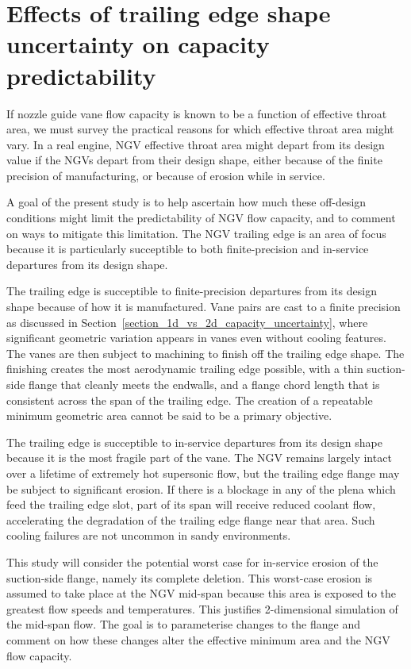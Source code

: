 \documentclass[a4paper, 11pt, twoside]{report}
\begin{document}
\section{Effects of trailing edge shape uncertainty on capacity predictability}

If nozzle guide vane flow capacity is known to be a function of effective throat area, we must survey the practical reasons for which effective throat area might vary. In a real engine, NGV effective throat area might depart from its design value if the NGVs depart from their design shape, either because of the finite precision of manufacturing, or because of erosion while in service. 

A goal of the present study is to help ascertain how much these off-design conditions might limit the predictability of NGV flow capacity, and to comment on ways to mitigate this limitation. The NGV trailing edge is an area of focus because it is particularly succeptible to both finite-precision and in-service departures from its design shape. 

The trailing edge is succeptible to finite-precision departures from its design shape because of how it is manufactured. Vane pairs are cast to a finite precision as discussed in Section~\ref{section_1d_vs_2d_capacity_uncertainty}, where significant geometric variation appears in vanes even without cooling features. The vanes are then subject to machining to finish off the trailing edge shape. The finishing creates the most aerodynamic trailing edge possible, with a thin suction-side flange that cleanly meets the endwalls, and a flange chord length that is consistent across the span of the trailing edge. The creation of a repeatable minimum geometric area cannot be said to be a primary objective.

The trailing edge is succeptible to in-service departures from its design shape because it is the most fragile part of the vane. The NGV remains largely intact over a lifetime of extremely hot supersonic flow, but the trailing edge flange may be subject to significant erosion. If there is a blockage in any of the plena which feed the trailing edge slot, part of its span will receive reduced coolant flow, accelerating the degradation of the trailing edge flange near that area. Such cooling failures are not uncommon in sandy environments.

This study will consider the potential worst case for in-service erosion of the suction-side flange, namely its complete deletion. This worst-case erosion is assumed to take place at the NGV mid-span because this area is exposed to the greatest flow speeds and temperatures. This justifies 2-dimensional simulation of the mid-span flow. The goal is to parameterise changes to the flange and comment on how these changes alter the effective minimum area and the NGV flow capacity.
\end{document}

